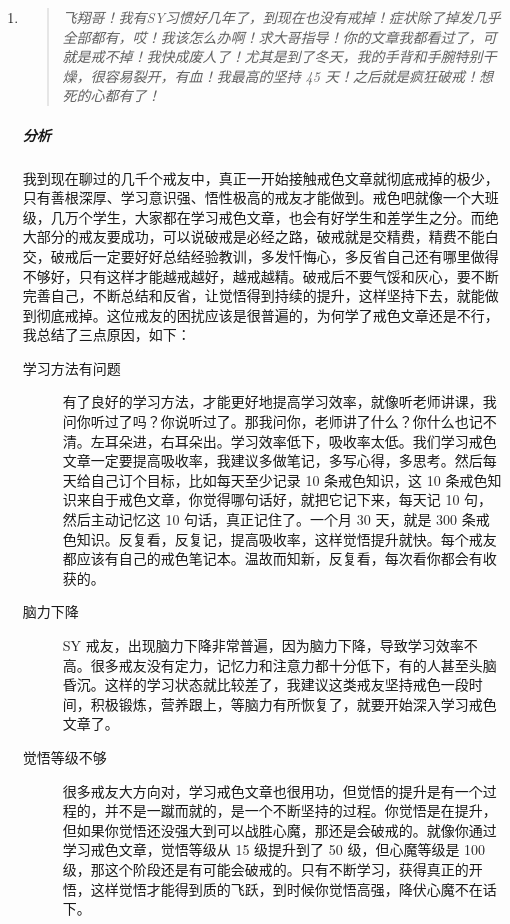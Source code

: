 \documentclass{ctexart}
\begin{document}
\begin{enumerate}
    \item \begin{quote}\it
        飞翔哥！我有SY习惯好几年了，到现在也没有戒掉！症状除了掉发几乎全部都有，哎！我该怎么办啊！求大哥指导！你的文章我都看过了，可就是戒不掉！我快成废人了！尤其是到了冬天，我的手背和手腕特别干燥，很容易裂开，有血！我最高的坚持 45 天！之后就是疯狂破戒！想死的心都有了！
    \end{quote}
    \subparagraph{分析} 我到现在聊过的几千个戒友中，真正一开始接触戒色文章就彻底戒掉的极少，只有善根深厚、学习意识强、悟性极高的戒友才能做到。戒色吧就像一个大班级，几万个学生，大家都在学习戒色文章，也会有好学生和差学生之分。而绝大部分的戒友要成功，可以说破戒是必经之路，破戒就是交精费，精费不能白交，破戒后一定要好好总结经验教训，多发忏悔心，多反省自己还有哪里做得不够好，只有这样才能越戒越好，越戒越精。破戒后不要气馁和灰心，要不断完善自己，不断总结和反省，让觉悟得到持续的提升，这样坚持下去，就能做到彻底戒掉。这位戒友的困扰应该是很普遍的，为何学了戒色文章还是不行，我总结了三点原因，如下：\begin{description}
        \item[学习方法有问题] 有了良好的学习方法，才能更好地提高学习效率，就像听老师讲课，我问你听过了吗？你说听过了。那我问你，老师讲了什么？你什么也记不清。左耳朵进，右耳朵出。学习效率低下，吸收率太低。我们学习戒色文章一定要提高吸收率，我建议多做笔记，多写心得，多思考。然后每天给自己订个目标，比如每天至少记录 10 条戒色知识，这 10 条戒色知识来自于戒色文章，你觉得哪句话好，就把它记下来，每天记 10 句，然后主动记忆这 10 句话，真正记住了。一个月 30 天，就是 300 条戒色知识。反复看，反复记，提高吸收率，这样觉悟提升就快。每个戒友都应该有自己的戒色笔记本。温故而知新，反复看，每次看你都会有收获的。
        \item[脑力下降] SY 戒友，出现脑力下降非常普遍，因为脑力下降，导致学习效率不高。很多戒友没有定力，记忆力和注意力都十分低下，有的人甚至头脑昏沉。这样的学习状态就比较差了，我建议这类戒友坚持戒色一段时间，积极锻炼，营养跟上，等脑力有所恢复了，就要开始深入学习戒色文章了。
        \item[觉悟等级不够] 很多戒友大方向对，学习戒色文章也很用功，但觉悟的提升是有一个过程的，并不是一蹴而就的，是一个不断坚持的过程。你觉悟是在提升，但如果你觉悟还没强大到可以战胜心魔，那还是会破戒的。就像你通过学习戒色文章，觉悟等级从 15 级提升到了 50 级，但心魔等级是 100 级，那这个阶段还是有可能会破戒的。只有不断学习，获得真正的开悟，这样觉悟才能得到质的飞跃，到时候你觉悟高强，降伏心魔不在话下。
    \end{description}

\end{enumerate}
\end{document}
